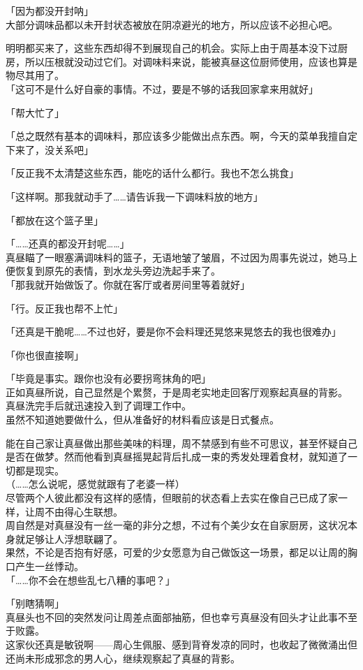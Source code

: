 「因为都没开封呐」\\

大部分调味品都以未开封状态被放在阴凉避光的地方，所以应该不必担心吧。

明明都买来了，这些东西却得不到展现自己的机会。实际上由于周基本没下过厨房，所以压根就没动过它们。对调味料来说，能被真昼这位厨师使用，应该也算是物尽其用了。\\

「这可不是什么好自豪的事情。不过，要是不够的话我回家拿来用就好」

「帮大忙了」

「总之既然有基本的调味料，那应该多少能做出点东西。啊，今天的菜单我擅自定下来了，没关系吧」

「反正我不太清楚这些东西，能吃的话什么都行。我也不怎么挑食」

「这样啊。那我就动手了……请告诉我一下调味料放的地方」

「都放在这个篮子里」

「……还真的都没开封呢……」\\

真昼瞄了一眼塞满调味料的篮子，无语地皱了皱眉，不过因为周事先说过，她马上便恢复到原先的表情，到水龙头旁边洗起手来了。\\

「那我就开始做饭了。你就在客厅或者房间里等着就好」

「行。反正我也帮不上忙」

「还真是干脆呢……不过也好，要是你不会料理还晃悠来晃悠去的我也很难办」

「你也很直接啊」

「毕竟是事实。跟你也没有必要拐弯抹角的吧」\\

正如真昼所说，自己显然是个累赘，于是周老实地走回客厅观察起真昼的背影。\\

真昼洗完手后就迅速投入到了调理工作中。\\

虽然不知道她要做什么，但从准备好的材料看应该是日式餐点。

能在自己家让真昼做出那些美味的料理，周不禁感到有些不可思议，甚至怀疑自己是否在做梦。然而他看到真昼摇晃起背后扎成一束的秀发处理着食材，就知道了一切都是现实。\\

（……怎么说呢，感觉就跟有了老婆一样）\\

尽管两个人彼此都没有这样的感情，但眼前的状态看上去实在像自己已成了家一样，让周不由得心生联想。\\

周自然是对真昼没有一丝一毫的非分之想，不过有个美少女在自家厨房，这状况本身就足够让人浮想联翩了。\\

果然，不论是否抱有好感，可爱的少女愿意为自己做饭这一场景，都足以让周的胸口产生一丝悸动。\\

「……你不会在想些乱七八糟的事吧？」

「别瞎猜啊」\\

真昼头也不回的突然发问让周差点面部抽筋，但也幸亏真昼没有回头才让此事不至于败露。\\

这家伙还真是敏锐啊——周心生佩服、感到背脊发凉的同时，也收起了微微涌出但还尚未形成邪念的男人心，继续观察起了真昼的背影。
